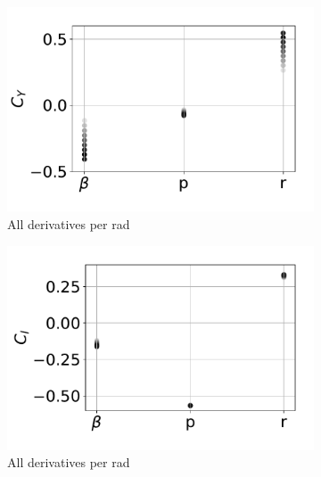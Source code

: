 \begin{figure}[hbt!]
	\centering
	\begin{subfigure}[b]{0.33\textwidth}
		\includegraphics[width=\textwidth]{CyCstAR}
		\caption{All derivatives per rad}
		\label{fig:CyCstAR}
	\end{subfigure}
	\begin{subfigure}[b]{0.33\textwidth}
		\includegraphics[width=\textwidth]{ClCstAR}
		\caption{All derivatives per rad}
		\label{fig:ClCstAR}
	\end{subfigure}
	\begin{subfigure}[b]{0.33\textwidth}

\end{subfigure}
\end{figure}
